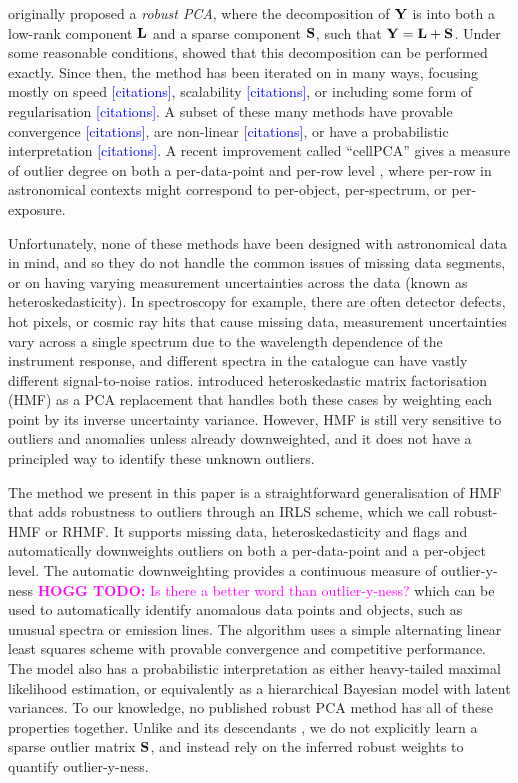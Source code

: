 \documentclass[onecolumn,floatfix]{aastex631}
\newcommand{\hoggtodo}[1]{\textcolor{magenta}{\textbf{HOGG TODO:} #1}}
\newcommand{\placeholder}[1]{\textcolor{blue}{[#1]}}
\begin{document}
\citet{candes2011} originally proposed a \emph{robust PCA}, where the decomposition of ${\bf Y}$ is into both a low-rank component ${\bf L}$ and a sparse component ${\bf S}$, such that ${\bf Y} = {\bf L} + {\bf S}$.
Under some reasonable conditions, \citet{candes2011} showed that this decomposition can be performed exactly.
Since then, the method has been iterated on in many ways, focusing mostly on speed \placeholder{citations}, scalability \placeholder{citations}, or including some form of regularisation \placeholder{citations}.
A subset of these many methods have provable convergence \placeholder{citations}, are non-linear \placeholder{citations}, or have a probabilistic interpretation \placeholder{citations}.
A recent improvement called ``cellPCA'' gives a measure of outlier degree on both a per-data-point and per-row level \citep{centofanti2024}, where per-row in astronomical contexts might correspond to per-object, per-spectrum, or per-exposure.

Unfortunately, none of these methods have been designed with astronomical data in mind, and so they do not handle the common issues of missing data segments, or on having varying measurement uncertainties across the data (known as heteroskedasticity).
In spectroscopy for example, there are often detector defects, hot pixels, or cosmic ray hits that cause missing data, measurement uncertainties vary across a single spectrum due to the wavelength dependence of the instrument response, and different spectra in the catalogue can have vastly different signal-to-noise ratios.
\cite{tsalmantza2012} introduced heteroskedastic matrix factorisation (HMF) as a PCA replacement that handles both these cases by weighting each point by its inverse uncertainty variance.
However, HMF is still very sensitive to outliers and anomalies unless already downweighted, and it does not have a principled way to identify these unknown outliers.

The method we present in this paper is a straightforward generalisation of HMF that adds robustness to outliers through an IRLS scheme, which we call robust-HMF or RHMF.
It supports missing data, heteroskedasticity and flags and automatically downweights outliers on both a per-data-point and a per-object level.
The automatic downweighting provides a continuous measure of outlier-y-ness \hoggtodo{Is there a better word than outlier-y-ness?} which can be used to automatically identify anomalous data points and objects, such as unusual spectra or emission lines.
The algorithm uses a simple alternating linear least squares scheme with provable convergence and competitive performance.
The model also has a probabilistic interpretation as either heavy-tailed maximal likelihood estimation, or equivalently as a hierarchical Bayesian model with latent variances.
To our knowledge, no published robust PCA method has all of these properties together.
Unlike \citet{candes2011} and its descendants \citep[e.g.][]{zhou2010,yin2019}, we do not explicitly learn a sparse outlier matrix ${\bf S}$, and instead rely on the inferred robust weights to quantify outlier-y-ness.
\end{document}
